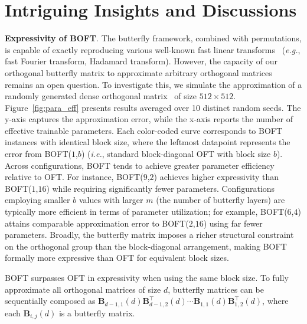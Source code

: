 \section{Intriguing Insights and Discussions}

\textbf{Expressivity of BOFT}. The butterfly framework, combined with permutations, is capable of exactly reproducing various well-known fast linear transforms~\cite{dao2019learning,dao2019kaleidoscope} (\emph{e.g.}, fast Fourier transform, Hadamard transform). However, the capacity of our orthogonal butterfly matrix to approximate arbitrary orthogonal matrices remains an open question. To investigate this, we simulate the approximation of a randomly generated dense orthogonal matrix~\cite{anderson1987generation} of size $512\times 512$. Figure~\ref{fig:para_eff} presents results averaged over 10 distinct random seeds. The y-axis captures the approximation error, while the x-axis reports the number of effective trainable parameters. Each color-coded curve corresponds to BOFT instances with identical block size, where the leftmost datapoint represents the error from BOFT($1$,$b$) (\emph{i.e.}, standard block-diagonal OFT with block size $b$). Across configurations, BOFT tends to achieve greater parameter efficiency relative to OFT. For instance, BOFT($9$,$2$) achieves higher expressivity than BOFT($1$,$16$) while requiring significantly fewer parameters. Configurations employing smaller $b$ values with larger $m$ (the number of butterfly layers) are typically more efficient in terms of parameter utilization; for example, BOFT($6$,$4$) attains comparable approximation error to BOFT($2$,$16$) using far fewer parameters. Broadly, the butterfly matrix imposes a richer structural constraint on the orthogonal group than the block-diagonal arrangement, making BOFT formally more expressive than OFT for equivalent block sizes.

\begin{theorem}\label{thm:exp_boft}
    BOFT surpasses OFT in expressivity when using the same block size. To fully approximate all orthogonal matrices of size $d$, butterfly matrices can be sequentially composed as $\bm{B}_{d-1,1}(d)\bm{B}^\top_{d-1,2}(d)\cdots\bm{B}_{1,1}(d)\bm{B}^\top_{1,2}(d)$, where each $\bm{B}_{i,j}(d)$ is a butterfly matrix.
\end{theorem}

